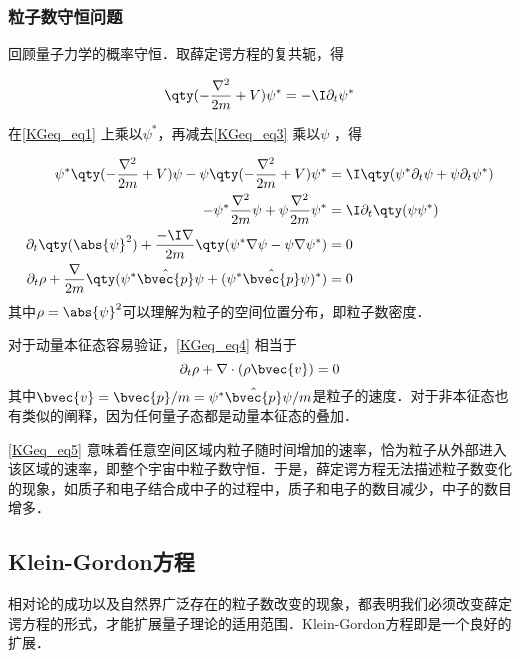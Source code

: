 \subsubsection{粒子数守恒问题}

回顾量子力学的概率守恒．取薛定谔方程的复共轭，得

\begin{equation}\label{KGeq_eq3}
\qty(-\frac{\nabla^2}{2m}+V)\psi^* = -\I \partial_t \psi^*
\end{equation}

在\autoref{KGeq_eq1} 上乘以$\psi^*$，再减去\autoref{KGeq_eq3} 乘以$\psi$ ，得

\begin{equation}\label{KGeq_eq4}
\begin{aligned}
\psi^*\qty(-\frac{\nabla^2}{2m}+V)\psi - \psi\qty(-\frac{\nabla^2}{2m}+V)\psi^* &= \I\qty(\psi^*\partial_t\psi + \psi\partial_t\psi^*)\\
-\psi^*\frac{\nabla^2}{2m}\psi + \psi\frac{\nabla^2}{2m}\psi^* &= \I \partial_t\qty(\psi\psi^*)\\
\partial_t\qty(\abs{\psi}^2) + \frac{-\I\nabla}{2m}\qty(\psi^*\nabla\psi-\psi\nabla\psi^*) &= 0\\
\partial_t \rho + \frac{\nabla}{2m} \qty(\psi^*\hat{\bvec{p}}\psi + (\psi^*\hat{\bvec{p}}\psi)^*) &= 0
\end{aligned}
\end{equation}
其中$\rho=\abs{\psi}^2$可以理解为粒子的空间位置分布，即粒子数密度．

对于动量本征态容易验证，\autoref{KGeq_eq4} 相当于
\begin{equation}\label{KGeq_eq5}
\partial_t\rho + \nabla\cdot(\rho \bvec{v}) = 0
\end{equation}
其中$\bvec{v}=\bvec{p}/m=\psi^*\hat{\bvec{p}}\psi/m$是粒子的速度．对于非本征态也有类似的阐释，因为任何量子态都是动量本征态的叠加．

\autoref{KGeq_eq5} 意味着任意空间区域内粒子随时间增加的速率，恰为粒子从外部进入该区域的速率，即整个宇宙中粒子数守恒．于是，薛定谔方程无法描述粒子数变化的现象，如质子和电子结合成中子的过程中，质子和电子的数目减少，中子的数目增多．



\subsection{Klein-Gordon方程}

相对论的成功以及自然界广泛存在的粒子数改变的现象，都表明我们必须改变薛定谔方程的形式，才能扩展量子理论的适用范围．Klein-Gordon方程即是一个良好的扩展．

